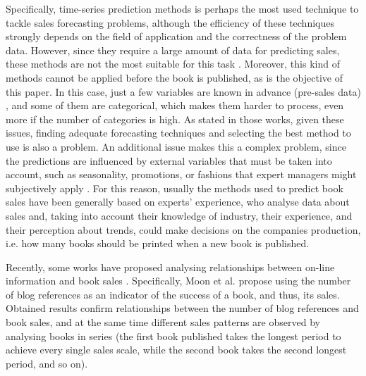 \documentclass[a4paper,10pt,twocolumn,preprint,3p]{elsarticle}
\begin{document}
Specifically, time-series prediction methods
\cite{Chu2003,Brown1959,Winters1960,Box1969,Papalexopoulos1990,KayacanUK10}  
is perhaps the most used technique to tackle sales forecasting
problems, although the efficiency of these techniques strongly depends on the 
field of application and the correctness of the problem data. However, since 
they require a large amount of data for predicting sales, these methods are not 
the most suitable for this task \cite{ChingChin2010}. 
Moreover, this kind of methods cannot be applied before the book is published, 
as is the objective of this paper. 
In this case, just a few variables are known in advance (pre-sales data)
\cite{ChingChin2010,FaderHardie2005,Madsen2008}, and some of 
them are categorical, which makes them harder to process, even more if 
the number of categories is high. As stated in those works, given these issues, 
finding adequate forecasting techniques and selecting the best method to use 
is also a problem.
An additional issue makes this a complex problem, since the predictions are 
influenced by external variables that must be taken into account, such as
seasonality, promotions, or fashions that expert managers might
subjectively apply \cite{Lapide1999,ChernWSF15}.
For this reason, usually the methods used to predict book sales have
been generally based on experts' experience, who analyse data about sales and, 
taking into account their knowledge of industry, their experience, 
and their perception about trends, could make decisions on the companies 
production, i.e. how many books should be printed when a new book is published. 

Recently, some works have proposed analysing relationships between on-line 
information and book sales \cite{Moon2010ICSSSM,Moon2010ICEC}. 
Specifically, Moon et al. propose using the number of blog references as an 
indicator of the success of a book, and thus, its sales. 
Obtained results confirm relationships between the number of blog references 
and book sales, and at the same time different sales patterns are observed 
by analysing books in series (the first book published takes the longest period 
to achieve every single sales scale, while the second book takes the second 
longest period, and so on).
\end{document}
